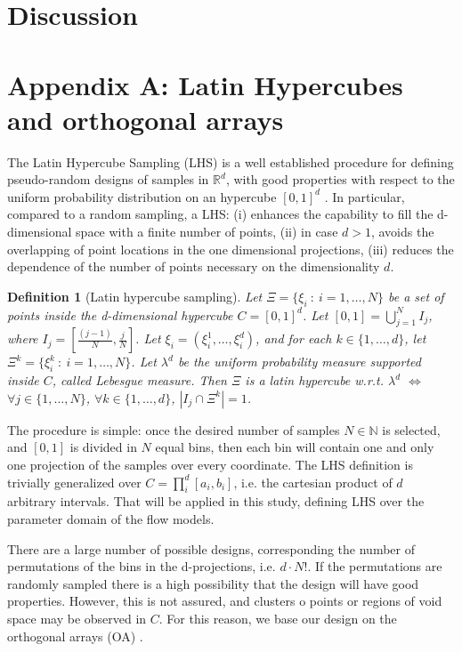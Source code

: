 \documentclass{article}
\newtheorem{definition}[theorem]{Definition}
\begin{document}
\section{Discussion}

\section*{Appendix A: Latin Hypercubes and orthogonal arrays}\label{Appendix}
The Latin Hypercube Sampling (LHS) is a well established procedure for defining pseudo-random designs of samples in $\mathbb R^d$, with good properties with respect to the uniform probability distribution on an hypercube $[0,1]^d$ \citep{McKay1979,Owen1992b,Stein1987,Ranjan2014,Mingyao2016}. In particular, compared to a random sampling, a LHS: (i) enhances the capability to fill the d-dimensional space with a finite number of points, (ii) in case $d>1$, avoids the overlapping of point locations in the one dimensional projections, (iii) reduces the dependence of the number of points necessary on the dimensionality $d$.

\begin{definition}[Latin hypercube sampling]
Let $\Xi=\{\xi_i\ :\ i=1,\dots,N\}$ be a set of points inside the d-dimensional hypercube $C=[0,1]^d$. Let $[0,1]=\bigcup_{j=1}^{N} I_j$, where $I_j=[\frac{(j-1)}{N},\frac{j}{N}]$. Let $\xi_i=\left(\xi_i^1,\dots,\xi_i^d\right)$, and for each $k\in\{1,\dots,d\}$, let $\Xi^k=\{\xi^k_i\ :\ i=1,\dots,N\}$. Let $\lambda^d$ be the uniform probability measure supported inside $C$, called Lebesgue measure. Then $\Xi$ is a latin hypercube w.r.t. $\lambda^d$ $\Longleftrightarrow$ $\forall j\in \{1,\dots,N\}$, $\forall k\in\{1,\dots,d\}$, $\left|I_j\cap\Xi^k\right|=1$.
\end{definition}

The procedure is simple: once the desired number of samples $N\in\mathbb N$ is selected, and $[0,1]$ is divided in $N$ equal bins, then each bin will contain one and only one projection of the samples over every coordinate. The LHS definition is trivially generalized over $C=\prod^d_i [a_i, b_i]$, i.e. the cartesian product of $d$ arbitrary intervals. That will be applied in this study, defining LHS over the parameter domain of the flow models.

There are a large number of possible designs, corresponding the number of permutations of the bins in the d-projections, i.e. $d\cdot N!$. If the permutations are randomly sampled there is a high possibility that the design will have good properties. However, this is not assured, and clusters o points or regions of void space may be observed in $C$. For this reason, we base our design on the orthogonal arrays (OA) \citep{Owen1992a,Tang1993}.
\end{document}
